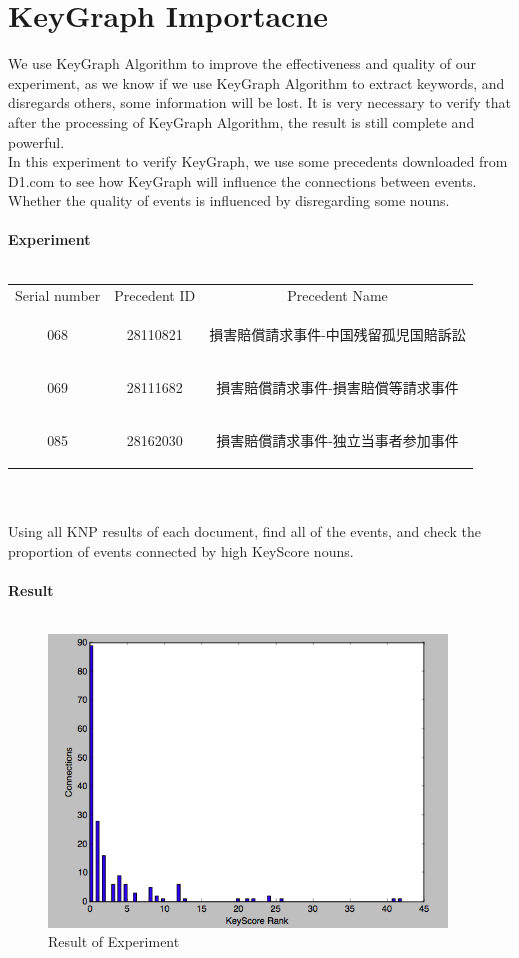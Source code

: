 \section{KeyGraph Importacne}
We use KeyGraph Algorithm to improve the effectiveness and quality of our experiment, as we know if we use KeyGraph Algorithm to extract keywords, and disregards others, some information will be lost. It is very necessary to verify that after the processing of KeyGraph Algorithm, the result is still complete and powerful.\\
In this experiment to verify KeyGraph, we use some precedents downloaded from D1.com to see how KeyGraph will influence the connections between events. Whether the quality of events is influenced by disregarding some nouns.\\ \\
\textbf{Experiment}\\ \\
\begin{table}[!h]
\centering
\begin{tabular}{ccc}
\hline
Serial number&Precedent ID&Precedent Name\\
068&28110821&\begin{CJK}{UTF8}{ipxm}損害賠償請求事件-中国残留孤児国賠訴訟\end{CJK}\\
069&28111682&\begin{CJK}{UTF8}{ipxm}損害賠償請求事件-損害賠償等請求事件\end{CJK}\\
085&28162030&\begin{CJK}{UTF8}{ipxm}損害賠償請求事件-独立当事者参加事件\end{CJK}\\
\hline
\end{tabular}
\end{table}
\\ \\
Using all KNP results of each document, find all of the events, and check the proportion of events connected by high KeyScore nouns.\\ \\ 
\textbf{Result}\\ \\
\begin{figure}[!h]
\centering
\includegraphics[width=300pt]{./pictures/0402-0.png}
\caption{Result of Experiment}
\end{figure}
